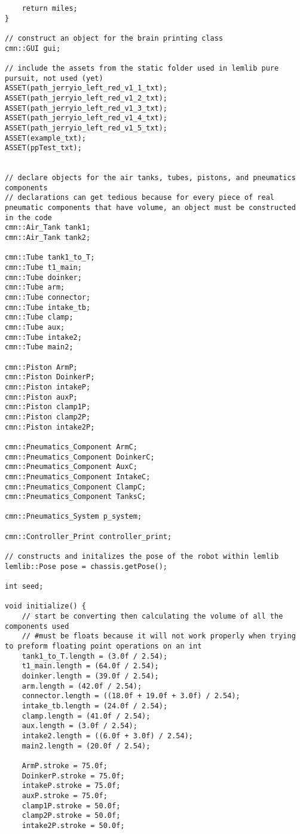 \begin{verbatim}
    return miles;
}

// construct an object for the brain printing class
cmn::GUI gui;

// include the assets from the static folder used in lemlib pure pursuit, not used (yet)
ASSET(path_jerryio_left_red_v1_1_txt);
ASSET(path_jerryio_left_red_v1_2_txt);
ASSET(path_jerryio_left_red_v1_3_txt);
ASSET(path_jerryio_left_red_v1_4_txt);
ASSET(path_jerryio_left_red_v1_5_txt);
ASSET(example_txt);
ASSET(ppTest_txt);


// declare objects for the air tanks, tubes, pistons, and pneumatics components
// declarations can get tedious because for every piece of real pneumatic components that have volume, an object must be constructed in the code
cmn::Air_Tank tank1;
cmn::Air_Tank tank2;

cmn::Tube tank1_to_T;
cmn::Tube t1_main;
cmn::Tube doinker;
cmn::Tube arm;
cmn::Tube connector;
cmn::Tube intake_tb;
cmn::Tube clamp;
cmn::Tube aux;
cmn::Tube intake2;
cmn::Tube main2;

cmn::Piston ArmP;
cmn::Piston DoinkerP;
cmn::Piston intakeP;
cmn::Piston auxP;
cmn::Piston clamp1P;
cmn::Piston clamp2P;
cmn::Piston intake2P;

cmn::Pneumatics_Component ArmC;
cmn::Pneumatics_Component DoinkerC;
cmn::Pneumatics_Component AuxC;
cmn::Pneumatics_Component IntakeC;
cmn::Pneumatics_Component ClampC;
cmn::Pneumatics_Component TanksC;

cmn::Pneumatics_System p_system;

cmn::Controller_Print controller_print;

// constructs and initalizes the pose of the robot within lemlib
lemlib::Pose pose = chassis.getPose();

int seed;

void initialize() {
    // start be converting then calculating the volume of all the components used
    // #must be floats because it will not work properly when trying to preform floating point operations on an int
    tank1_to_T.length = (3.0f / 2.54);
    t1_main.length = (64.0f / 2.54);
    doinker.length = (39.0f / 2.54);
    arm.length = (42.0f / 2.54);
    connector.length = ((18.0f + 19.0f + 3.0f) / 2.54);
    intake_tb.length = (24.0f / 2.54);
    clamp.length = (41.0f / 2.54);
    aux.length = (3.0f / 2.54);
    intake2.length = ((6.0f + 3.0f) / 2.54);
    main2.length = (20.0f / 2.54);

    ArmP.stroke = 75.0f;
    DoinkerP.stroke = 75.0f;
    intakeP.stroke = 75.0f;
    auxP.stroke = 75.0f;
    clamp1P.stroke = 50.0f;
    clamp2P.stroke = 50.0f;
    intake2P.stroke = 50.0f;


\end{verbatim}
